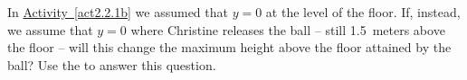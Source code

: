 \label{fnt2.2.1-4}

In \hyperref[act2.2.1b]{Activity~\ref*{act2.2.1b}} we assumed that $y = 0$ at the level of the floor. If, instead, we assume that $y = 0$ where Christine releases the ball -- still 1.5~meters above the floor -- will this change the maximum height above the floor attained by the ball? Use the \EnergyInteractionModel{} to answer this question.